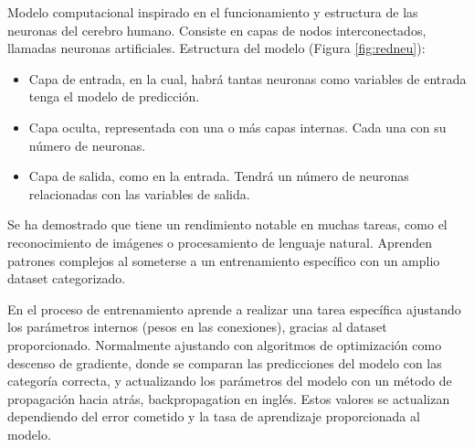 Modelo computacional inspirado en el funcionamiento y estructura de las neuronas del cerebro humano. Consiste en capas de nodos interconectados, llamadas neuronas artificiales. Estructura del modelo (Figura \ref{fig:redneu}):


\begin{itemize}
	\item Capa de entrada, en la cual, habrá tantas neuronas como variables de entrada tenga el modelo de predicción.
	\item Capa oculta, representada con una o más capas internas. Cada una con su número de neuronas.	
	\item Capa de salida, como en la entrada. Tendrá un número de neuronas relacionadas con las variables de salida.
\end{itemize}

Se ha demostrado que tiene un rendimiento notable en muchas tareas, como el reconocimiento de imágenes o procesamiento de lenguaje natural. Aprenden patrones complejos al someterse a un entrenamiento específico con un amplio dataset categorizado.	


En el proceso de entrenamiento aprende a realizar una tarea específica ajustando los parámetros internos (pesos en las conexiones), gracias al dataset proporcionado. Normalmente ajustando con algoritmos de optimización como descenso de gradiente, donde se comparan las predicciones del modelo con las categoría correcta, y actualizando los parámetros del modelo con un método de propagación hacia atrás, backpropagation en inglés. Estos valores se actualizan dependiendo del error cometido y la tasa de aprendizaje proporcionada al modelo.



